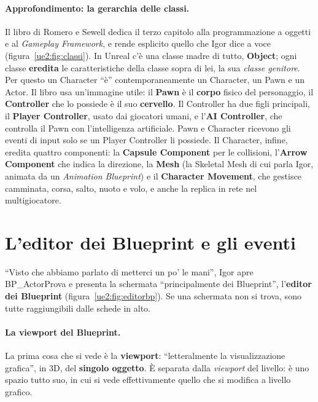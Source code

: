 \paragraph{Approfondimento: la gerarchia delle classi.} Il libro di Romero e Sewell
dedica il terzo capitolo alla programmazione a oggetti e al \emph{Gameplay Framework}, e
rende esplicito quello che Igor dice a voce (figura~\ref{ue2:fig:classi}). In Unreal
c'è una classe madre di tutto, \textbf{Object}; ogni classe \textbf{eredita} le
caratteristiche della classe sopra di lei, la sua \emph{classe genitore}. Per questo un
Character ``è'' contemporaneamente un Character, un Pawn e un Actor. Il libro usa
un'immagine utile: il \textbf{Pawn} è il \textbf{corpo} fisico del personaggio, il
\textbf{Controller} che lo possiede è il suo \textbf{cervello}. Il Controller ha due
figli principali, il \textbf{Player Controller}, usato dai giocatori umani, e
l'\textbf{AI Controller}, che controlla il Pawn con l'intelligenza artificiale. Pawn e
Character ricevono gli eventi di input solo se un Player Controller li possiede. Il
Character, infine, eredita quattro componenti: la \textbf{Capsule Component} per le
collisioni, l'\textbf{Arrow Component} che indica la direzione, la \textbf{Mesh} (la
Skeletal Mesh di cui parla Igor, animata da un \emph{Animation Blueprint}) e il
\textbf{Character Movement}, che gestisce camminata, corsa, salto, nuoto e volo, e anche
la replica in rete nel multigiocatore.

\section{L'editor dei Blueprint e gli eventi}
\label{ue2:sec:editor}

``Visto che abbiamo parlato di metterci un po' le mani'', Igor apre BP\_ActorProva e
presenta la schermata ``principalmente dei Blueprint'', l'\textbf{editor dei Blueprint}
(figura~\ref{ue2:fig:editorbp}). Se una schermata non si trova, sono tutte raggiungibili
dalle schede in alto.

\paragraph{La viewport del Blueprint.} La prima cosa che si vede è la
\textbf{viewport}: ``letteralmente la visualizzazione grafica'', in 3D, del
\textbf{singolo oggetto}. È separata dalla \emph{viewport} del livello: è uno spazio
tutto suo, in cui si vede effettivamente quello che si modifica a livello grafico.

